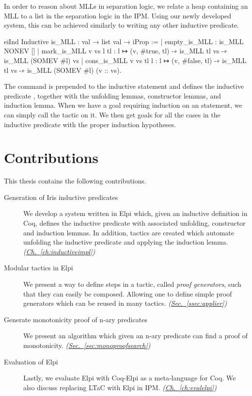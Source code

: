 \documentclass[thesis.tex]{subfiles}
\begin{document}
In order to reason about MLLs in separation logic, we relate a heap containing an MLL to a list in the separation logic in the IPM. Using our newly developed system, this can be achieved similarly to writing any other inductive predicate.
\begin{coqcode}
  eiInd
  Inductive is_MLL : val → list val → iProp :=
      | empty_is_MLL : is_MLL NONEV []
      | mark_is_MLL v vs l tl : 
        l ↦ (v, #true, tl) -∗ is_MLL tl vs -∗ 
        is_MLL (SOMEV #l) vs
      | cons_is_MLL v vs tl l : 
        l ↦ (v, #false, tl) -∗ is_MLL tl vs -∗ 
        is_MLL (SOMEV #l) (v :: vs).
\end{coqcode}
The command  is prepended to the inductive statement and defines the inductive predicate , together with the unfolding lemmas, constructor lemmas, and induction lemma. When we have a goal requiring induction on an  statement, we can simply call the  tactic on it. We then get goals for all the cases in the inductive predicate with the proper induction hypotheses.


\section{Contributions}
This thesis contains the following contributions.
\begin{description}
  \item[Generation of Iris inductive predicates] We develop a system written in Elpi which, given an inductive definition in Coq, defines the inductive predicate with associated unfolding, constructor and induction lemmas. In addition, tactics are created which automate unfolding the inductive predicate and applying the induction lemma. \emph{(\hyperref[ch:inductiveimpl]{Ch.~\ref*{ch:inductiveimpl}})}
  \item[Modular tactics in Elpi] We present a way to define steps in a tactic, called \emph{proof generators}, such that they can easily be composed. Allowing one to define simple proof generators which can be reused in many tactics. \emph{(\hyperref[ssec:applier]{Sec.~\ref*{ssec:applier}})}
  \item[Generate monotonicity proof of n-ary predicates] We present an algorithm which given an n-ary predicate can find a proof of monotonicity. \emph{(\hyperref[sec:monoproofsearch]{Sec.~\ref*{sec:monoproofsearch}})}
  \item[Evaluation of Elpi] Lastly, we evaluate Elpi with Coq-Elpi as a meta-language for Coq. We also discuss replacing LTaC with Elpi in IPM. \emph{(\hyperref[ch:evalelpi]{Ch.~\ref*{ch:evalelpi}})}
\end{description}
\end{document}
